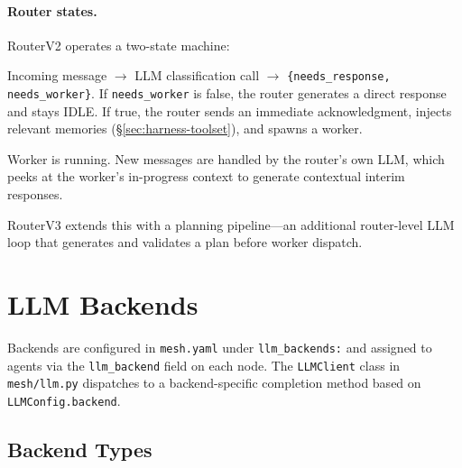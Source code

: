 \documentclass[11pt,a4paper]{article}
\newcommand{\code}[1]{\texttt{#1}}
\begin{document}
\paragraph{Router states.}
RouterV2 operates a two-state machine:
\begin{description}[nosep, leftmargin=1.5em, labelwidth=1.2em]
  \item[IDLE] Incoming message $\to$ LLM classification call $\to$
    \code{\{needs\_response, needs\_worker\}}.  If
    \code{needs\_worker} is false, the router generates a direct
    response and stays IDLE.  If true, the router sends an immediate
    acknowledgment, injects relevant memories
    (\S\ref{sec:harness-toolset}), and spawns a worker.
  \item[BUSY] Worker is running.  New messages are handled by the
    router's own LLM, which peeks at the worker's in-progress
    context to generate contextual interim responses.
\end{description}

\noindent RouterV3 extends this with a planning pipeline---an
additional router-level LLM loop that generates and validates a plan
before worker dispatch.

\section{LLM Backends}
\label{sec:backends}

Backends are configured in \code{mesh.yaml} under \code{llm\_backends:}
and assigned to agents via the \code{llm\_backend} field on each node.
The \code{LLMClient} class in \code{mesh/llm.py} dispatches to a
backend-specific completion method based on \code{LLMConfig.backend}.

\subsection{Backend Types}
\end{document}
